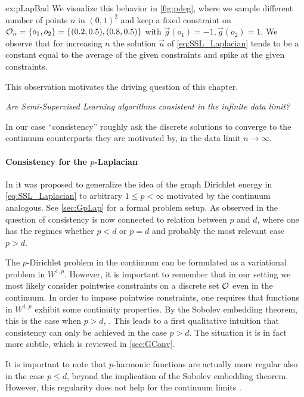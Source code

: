 %
%
\begin{example}{}{ex:pLapBad}
We visualize this behavior in \cref{fig:pdeg}, where we sample different number of points $n$ in $(0,1)^2$ and keep a fixed constraint on $\mathcal{O}_n=\{o_1, o_2\}=\{(0.2,0.5), (0.8, 0.5)\}$ with $\vec g(o_1) = -1, \vec g(o_2)=1$. We observe that for increasing $n$ the solution $\vec u$ of \cref{eq:SSL_Laplacian} tends to be a constant equal to the average of the given constraints and spike at the given constraints.
\end{example}
%
%
This observation motivates the driving question of this chapter.
%
\begin{center}
\textit{%
Are Semi-Supervised Learning algorithms consistent in the infinite data limit?}
\end{center}
%
In our case \enquote{consistency} roughly ask the discrete solutions to converge to the continuum counterparts they are motivated by, in the data limit $n\to\infty$.
%
%
\paragraph{Consistency for the $p$-Laplacian} 
In \cite{zhou2005regularization} it was proposed to generalize the idea of the graph Dirichlet energy in \cref{eq:SSL_Laplacian} to arbitrary $1\leq p < \infty$ motivated by the continuum analogous. See \cref{sec:GpLap} for a formal problem setup. As observed in \cite{nadler2009statistical, alamgir2011phase, el2016asymptotic} the question of consistency is now connected to relation between $p$ and $d$, where one has the regimes whether $p<d$ or  $p=d$ and probably the most relevant case $p>d$.

The $p$-Dirichlet problem in the continuum can be formulated as a variational problem in $W^{1,p}$. However, it is important to remember that in our setting we most likely consider pointwise constraints on a discrete set $\mathcal{O}$ even in the continuum. In order to impose pointwise constraints, one requires that functions in $W^{1,p}$ exhibit some continuity properties. By the Sobolev embedding theorem, this is the case when $p>d$, \cite{adams2003sobolev}. This leads to a first qualitative intuition that consistency can only be achieved in the case $p>d$. The situation it is in fact more subtle, which is reviewed in \cref{sec:GConv}. 

It is important to note that $p$-harmonic functions are actually more regular also in the case $p\leq d$, beyond the implication of the Sobolev embedding theorem. However, this regularity does not help for the continuum limits \cite{nadler2009statistical, alamgir2011phase, el2016asymptotic}.

